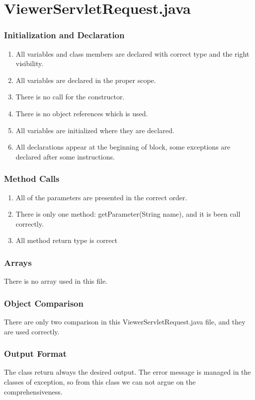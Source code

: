 \documentclass{article}
\begin{document}
\newpage

\section{ViewerServletRequest.java}

\subsubsection{Initialization and Declaration}
\begin{enumerate}
\item 
All variables and class members are declared with correct type and the right visibility.
\item
All variables are declared in the proper scope.
\item
There is no call for the constructor.
\item
There is no object references which is used.
\item 
All variables are initialized where they are declared.
\item
All declarations appear at the beginning of block, some exceptions are declared after some instructions.
\end{enumerate}

\subsubsection{Method Calls}
\begin{enumerate}
	\item All of the parameters are presented in the correct order.
	\item There is only one method: getParameter(String name), and it is been call correctly.
	\item All method return type is correct
\end{enumerate}
 
\subsubsection{Arrays}
There is no array used in this file.

\subsubsection{Object Comparison}
There are only two comparison in this ViewerServletRequest.java file, and they are used correctly.

\subsubsection{Output Format}
The class return always the desired output.
The error message is managed in the classes of exception, so from this class we can not argue on the comprehensiveness.
\end{document}
